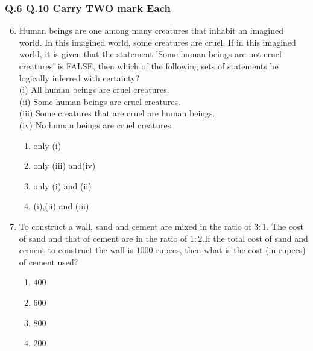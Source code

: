 \documentclass[journal]{IEEEtran}
\theoremstyle{remark}
\begin{document}
\subsubsection{\underline{Q.6 \text{-} Q.10 Carry TWO mark Each}}
\begin{enumerate}[itemsep=1em]
\setcounter{enumi}{5}
\item Human beings are one among many creatures that inhabit an imagined world. In this imagined world, some creatures are cruel. If in this imagined world, it is given that the statement 'Some human beings are not cruel creatures' is FALSE, then which of the following sets of statements be logically inferred with certainty? \\
(i) All human beings are cruel creatures. \\
(ii) Some human beings are cruel creatures. \\
(iii) Some creatures that are cruel are human beings. \\
(iv) No human beings are cruel creatures.\\
\begin{multicols}{4}
\begin{enumerate}
     \item only (i) 
     \item only (iii) and(iv) 
     \item only (i) and (ii) 
     \item (i),(ii) and (iii) 
\end{enumerate}
\end{multicols}
\end{enumerate}

\begin{enumerate}[itemsep=1em]
\setcounter{enumi}{6}
\item To construct a wall, sand and cement are mixed in the ratio of $3:1$. The cost of sand and that of cement are in the ratio of $1:2$.If the total cost of sand and cement to construct the wall is $1000$ rupees, then what is the cost (in rupees) of cement used? 
\begin{multicols}{4}
\begin{enumerate}
       \item $400$
       \item $600$
       \item $800$
       \item $200$
\end{enumerate}
\end{multicols}
\end{enumerate}
\end{document}
